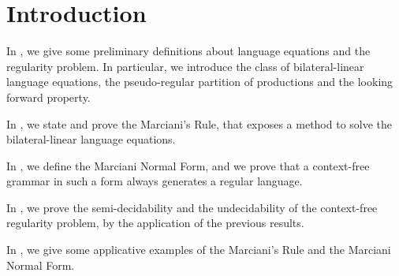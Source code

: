 \section{Introduction}
\label{sec:introduction}

In , we give some preliminary definitions about language equations and the regularity problem. 
In particular, we introduce the class of bilateral-linear language equations, the pseudo-regular partition of productions and the looking forward property.

In , we state and prove the Marciani's Rule, that exposes a method to solve the bilateral-linear language equations.

In , we define the Marciani Normal Form, and we prove that a context-free grammar in such a form always generates a regular language.

In , we prove the semi-decidability and the undecidability of the context-free regularity problem, by the application of the previous results.

In , we give some applicative examples of the Marciani's Rule and the Marciani Normal Form.
